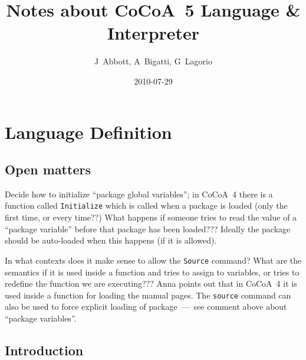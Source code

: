 \documentclass{book}[12,a4paper]
\title{Notes about CoCoA~5 Language \& Interpreter}
\author{J~Abbott, A~Bigatti, G~Lagorio}
\date{2010-07-29}
\begin{document}
\lstset{language=pascal}
\lstset{commentstyle=\textit}

\maketitle
\begin{multicols}{2}
\tableofcontents
\end{multicols}

\part{Language Definition}

\chapter{Open matters}
\label{open-matters}


Decide how to initialize ``package global variables''; in CoCoA~4 there is
a function called \texttt{Initialize} which is called when a package is
loaded (only the first time, or every time??)  What happens if someone
tries to read the value of a ``package variable'' before that package has
been loaded???  Ideally the package should be auto-loaded when this happens
(if it is allowed).

In what contexts does it make sense to allow the \texttt{Source} command?
What are the semantics if it is used inside a function and tries to assign
to variables, or tries to redefine the function we are executing???
Anna points out that in CoCoA~4 it is used inside a function for loading
the manual pages.  The \texttt{source} command can also be used to force
explicit loading of package~---~see comment above about ``package variables''.


\chapter{Introduction}
\end{document}
